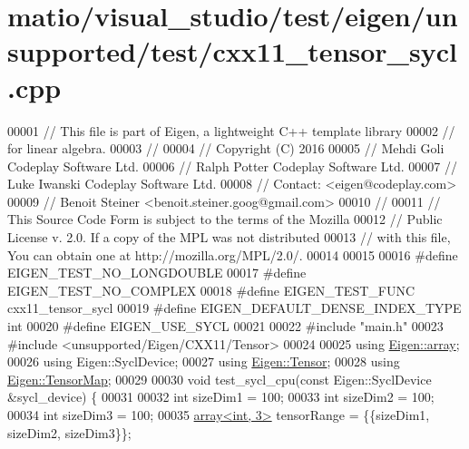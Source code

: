 \hypertarget{matio_2visual__studio_2test_2eigen_2unsupported_2test_2cxx11__tensor__sycl_8cpp_source}{}\section{matio/visual\+\_\+studio/test/eigen/unsupported/test/cxx11\+\_\+tensor\+\_\+sycl.cpp}
\label{matio_2visual__studio_2test_2eigen_2unsupported_2test_2cxx11__tensor__sycl_8cpp_source}

\begin{DoxyCode}
00001 \textcolor{comment}{// This file is part of Eigen, a lightweight C++ template library}
00002 \textcolor{comment}{// for linear algebra.}
00003 \textcolor{comment}{//}
00004 \textcolor{comment}{// Copyright (C) 2016}
00005 \textcolor{comment}{// Mehdi Goli    Codeplay Software Ltd.}
00006 \textcolor{comment}{// Ralph Potter  Codeplay Software Ltd.}
00007 \textcolor{comment}{// Luke Iwanski  Codeplay Software Ltd.}
00008 \textcolor{comment}{// Contact: <eigen@codeplay.com>}
00009 \textcolor{comment}{// Benoit Steiner <benoit.steiner.goog@gmail.com>}
00010 \textcolor{comment}{//}
00011 \textcolor{comment}{// This Source Code Form is subject to the terms of the Mozilla}
00012 \textcolor{comment}{// Public License v. 2.0. If a copy of the MPL was not distributed}
00013 \textcolor{comment}{// with this file, You can obtain one at http://mozilla.org/MPL/2.0/.}
00014 
00015 
00016 \textcolor{preprocessor}{#define EIGEN\_TEST\_NO\_LONGDOUBLE}
00017 \textcolor{preprocessor}{#define EIGEN\_TEST\_NO\_COMPLEX}
00018 \textcolor{preprocessor}{#define EIGEN\_TEST\_FUNC cxx11\_tensor\_sycl}
00019 \textcolor{preprocessor}{#define EIGEN\_DEFAULT\_DENSE\_INDEX\_TYPE int}
00020 \textcolor{preprocessor}{#define EIGEN\_USE\_SYCL}
00021 
00022 \textcolor{preprocessor}{#include "main.h"}
00023 \textcolor{preprocessor}{#include <unsupported/Eigen/CXX11/Tensor>}
00024 
00025 \textcolor{keyword}{using} \hyperlink{class_eigen_1_1array}{Eigen::array};
00026 \textcolor{keyword}{using} Eigen::SyclDevice;
00027 \textcolor{keyword}{using} \hyperlink{class_eigen_1_1_tensor}{Eigen::Tensor};
00028 \textcolor{keyword}{using} \hyperlink{class_eigen_1_1_tensor_map}{Eigen::TensorMap};
00029 
00030 \textcolor{keywordtype}{void} test\_sycl\_cpu(\textcolor{keyword}{const} Eigen::SyclDevice &sycl\_device) \{
00031 
00032   \textcolor{keywordtype}{int} sizeDim1 = 100;
00033   \textcolor{keywordtype}{int} sizeDim2 = 100;
00034   \textcolor{keywordtype}{int} sizeDim3 = 100;
00035   \hyperlink{class_eigen_1_1array}{array<int, 3>} tensorRange = \{\{sizeDim1, sizeDim2, sizeDim3\}\};

\end{DoxyCode}
